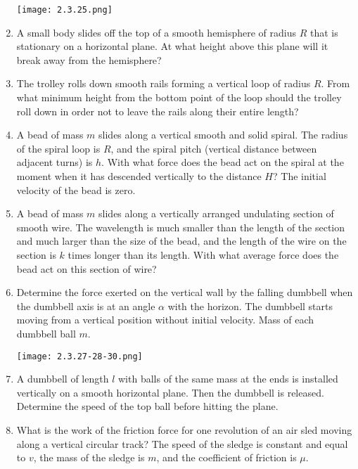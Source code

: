 \documentclass{article}
\begin{document}
\begin{enumerate}[label=2.3.\arabic*]
\begin{center}
    \texttt{[image: 2.3.25.png]}
\end{center}


\item A small body slides off the top of a smooth hemisphere of radius $R$ that is stationary on a horizontal plane. At what height above this plane will it break away from the hemisphere?

\item The trolley rolls down smooth rails forming a vertical loop of radius $R$. From what minimum height from the bottom point of the loop should the trolley roll down in order not to leave the rails along their entire length?

\item A bead of mass $m$ slides along a vertical smooth and solid spiral. The radius of the spiral loop is $R$, and the spiral pitch (vertical distance between adjacent turns) is $h$. With what force does the bead act on the spiral at the moment when it has descended vertically to the distance $H$? The initial velocity of the bead is zero.

\item A bead of mass $m$ slides along a vertically arranged undulating section of smooth wire. The wavelength is much smaller than the length of the section and much larger than the size of the bead, and the length of the wire on the section is $k$ times longer than its length. With what average force does the bead act on this section of wire?

\item Determine the force exerted on the vertical wall by the falling dumbbell when the dumbbell axis is at an angle $\alpha$ with the horizon. The dumbbell starts moving from a vertical position without initial velocity. Mass of each dumbbell ball $m$.

\begin{center}
    \texttt{[image: 2.3.27-28-30.png]}
\end{center}


\item A dumbbell of length $l$ with balls of the same mass at the ends is installed vertically on a smooth horizontal plane. Then the dumbbell is released. Determine the speed of the top ball before hitting the plane.

\item What is the work of the friction force for one revolution of an air sled moving along a vertical circular track? The speed of the sledge is constant and equal to $v$, the mass of the sledge is $m$, and the coefficient of friction is $\mu$.


\end{enumerate}
\end{document}
